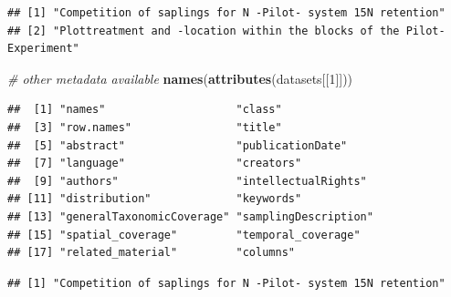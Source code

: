 \documentclass[]{article}
\newenvironment{Shaded}{}{}
\newcommand{\KeywordTok}[1]{\textcolor[rgb]{0.00,0.44,0.13}{\textbf{{#1}}}}
\newcommand{\DataTypeTok}[1]{\textcolor[rgb]{0.56,0.13,0.00}{{#1}}}
\newcommand{\DecValTok}[1]{\textcolor[rgb]{0.25,0.63,0.44}{{#1}}}
\newcommand{\CommentTok}[1]{\textcolor[rgb]{0.38,0.63,0.69}{\textit{{#1}}}}
\newcommand{\NormalTok}[1]{{#1}}
\begin{document}
\begin{Shaded}
\end{Shaded}

\begin{verbatim}
## [1] "Competition of saplings for N -Pilot- system 15N retention"           
## [2] "Plottreatment and -location within the blocks of the Pilot-Experiment"
\end{verbatim}

\begin{Shaded}
\begin{Highlighting}[]

\CommentTok{# other metadata available}
\KeywordTok{names}\NormalTok{(}\KeywordTok{attributes}\NormalTok{(datasets[[}\DecValTok{1}\NormalTok{]]))}
\end{Highlighting}
\end{Shaded}

\begin{verbatim}
##  [1] "names"                    "class"                   
##  [3] "row.names"                "title"                   
##  [5] "abstract"                 "publicationDate"         
##  [7] "language"                 "creators"                
##  [9] "authors"                  "intellectualRights"      
## [11] "distribution"             "keywords"                
## [13] "generalTaxonomicCoverage" "samplingDescription"     
## [15] "spatial_coverage"         "temporal_coverage"       
## [17] "related_material"         "columns"
\end{verbatim}

\begin{Shaded}
\end{Shaded}

\begin{verbatim}
## [1] "Competition of saplings for N -Pilot- system 15N retention"
\end{verbatim}
\end{document}
